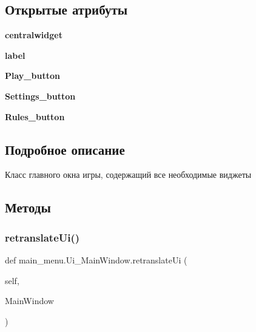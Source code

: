 \subsection*{Открытые атрибуты}
\begin{DoxyCompactItemize}
\item 
\mbox{\label{classmain__menu_1_1_ui___main_window_a7d0551038b28d0f3662a7fecedab39aa}} 
{\bfseries centralwidget}
\item 
\mbox{\label{classmain__menu_1_1_ui___main_window_ad68545e9f2cb04bb0e9b9ffb812551e8}} 
{\bfseries label}
\item 
\mbox{\label{classmain__menu_1_1_ui___main_window_a6ee41d3a7ff065fbebd455a0d72df461}} 
{\bfseries Play\+\_\+button}
\item 
\mbox{\label{classmain__menu_1_1_ui___main_window_ab6a4c2ab6f216b914fd3c43247f168df}} 
{\bfseries Settings\+\_\+button}
\item 
\mbox{\label{classmain__menu_1_1_ui___main_window_a18fe4e29ea44d35885881c30cb60b07a}} 
{\bfseries Rules\+\_\+button}
\end{DoxyCompactItemize}


\subsection{Подробное описание}
Класс главного окна игры, содержащий все необходимые виджеты 



\subsection{Методы}
\mbox{\label{classmain__menu_1_1_ui___main_window_afc5b3b59947cb086923048a8fda86243}} 
\subsubsection{\texorpdfstring{retranslateUi()}{retranslateUi()}}
{\footnotesize\ttfamily def main\+\_\+menu.\+Ui\+\_\+\+Main\+Window.\+retranslate\+Ui (\begin{DoxyParamCaption}\item[{}]{self,  }\item[{}]{Main\+Window }\end{DoxyParamCaption})}



